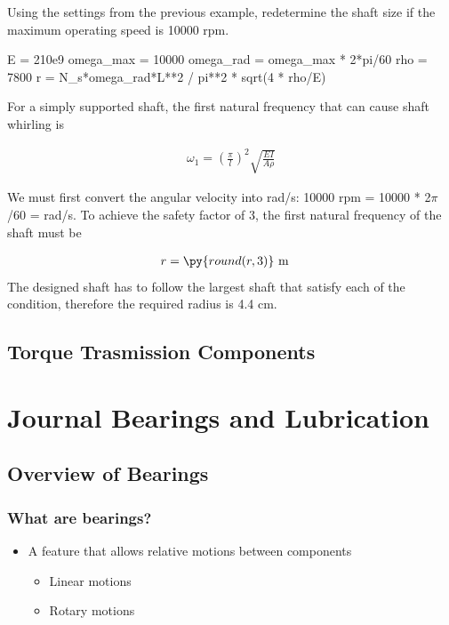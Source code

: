 \documentclass[
10pt,
a4paper,
openany,
svgnames,
]{book}
\begin{document}
\begin{example} Using the settings from the previous example, redetermine the shaft size if the maximum operating speed is 10000 rpm.

  \begin{pycode}
    E = 210e9
    omega_max = 10000
    omega_rad = omega_max * 2*pi/60
    rho = 7800
    r = N_s*omega_rad*L**2 / pi**2 * sqrt(4 * rho/E)
  \end{pycode}


\end{example}
\begin{solution}
  For a simply supported shaft, the first natural frequency that can cause shaft whirling is

  \begin{align*}
    \omega_{1} = \left( \frac{\pi}{l} \right)^{2} \sqrt{ \frac{EI}{A \rho} }
  \end{align*}

  We must first convert the angular velocity into rad/s: 10000 rpm = 10000 * 2$\pi$/60 =  rad/s. To achieve the safety factor of 3, the first natural frequency of the shaft must be

  \begin{align*}
    r &= \py{round(r,3)} \text{ m}
  \end{align*}
  The designed shaft has to follow the largest shaft that satisfy each of the condition, therefore the required radius is 4.4 cm.
\end{solution}

\section{Torque Trasmission Components} \label{sec: torque transmission components}

\chapter{Journal Bearings and Lubrication}

\section*{Overview of Bearings}
\label{sec:org555f498}

\subsection*{What are bearings?}
\label{sec:orgfea7d47}
\begin{itemize}
\item A feature that allows relative motions between components
\begin{itemize}
\item Linear motions
\item Rotary motions
\end{itemize}
\end{itemize}
\end{document}
